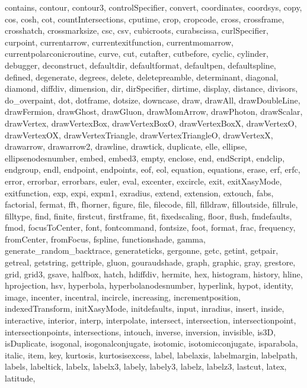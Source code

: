 {{  contains, contour, contour3, controlSpecifier, convert, coordinates,
  coordsys, copy, cos, cosh, cot, countIntersections, cputime, crop,
  cropcode, cross, crossframe, crosshatch, crossmarksize, csc, csv,
  cubicroots, curabscissa, curlSpecifier, curpoint, currentarrow,
  currentexitfunction, currentmomarrow, currentpolarconicroutine, curve, cut,
  cutafter, cutbefore, cyclic, cylinder, debugger, deconstruct, defaultdir,
  defaultformat, defaultpen, defaultspline, defined, degenerate, degrees,
  delete, deletepreamble, determinant, diagonal, diamond, diffdiv, dimension,
  dir, dirSpecifier, dirtime, display, distance, divisors, do_overpaint, dot,
  dotframe, dotsize, downcase, draw, drawAll, drawDoubleLine, drawFermion,
  drawGhost, drawGluon, drawMomArrow, drawPhoton, drawScalar, drawVertex,
  drawVertexBox, drawVertexBoxO, drawVertexBoxX, drawVertexO, drawVertexOX,
  drawVertexTriangle, drawVertexTriangleO, drawVertexX, drawarrow,
  drawarrow2, drawline, drawtick, duplicate, elle, ellipse,
  ellipsenodesnumber, embed, embed3, empty, enclose, end, endScript, endclip,
  endgroup, endl, endpoint, endpoints, eof, eol, equation, equations, erase,
  erf, erfc, error, errorbar, errorbars, euler, eval, excenter, excircle,
  exit, exitXasyMode, exitfunction, exp, expi, expm1, exradius, extend,
  extension, extouch, fabs, factorial, fermat, fft, fhorner, figure, file,
  filecode, fill, filldraw, filloutside, fillrule, filltype, find, finite,
  firstcut, firstframe, fit, fixedscaling, floor, flush, fmdefaults, fmod,
  focusToCenter, font, fontcommand, fontsize, foot, format, frac, frequency,
  fromCenter, fromFocus, fspline, functionshade, gamma,
  generate_random_backtrace, generateticks, gergonne, getc, getint, getpair,
  getreal, getstring, gettriple, gluon, gouraudshade, graph, graphic, gray,
  grestore, grid, grid3, gsave, halfbox, hatch, hdiffdiv, hermite, hex,
  histogram, history, hline, hprojection, hsv, hyperbola,
  hyperbolanodesnumber, hyperlink, hypot, identity, image, incenter,
  incentral, incircle, increasing, incrementposition, indexedTransform,
  initXasyMode, initdefaults, input, inradius, insert, inside, interactive,
  interior, interp, interpolate, intersect, intersection, intersectionpoint,
  intersectionpoints, intersections, intouch, inverse, inversion, invisible,
  is3D, isDuplicate, isogonal, isogonalconjugate, isotomic,
  isotomicconjugate, isparabola, italic, item, key, kurtosis, kurtosisexcess,
  label, labelaxis, labelmargin, labelpath, labels, labeltick, labelx,
  labelx3, labely, labely3, labelz, labelz3, lastcut, latex, latitude,
}}

